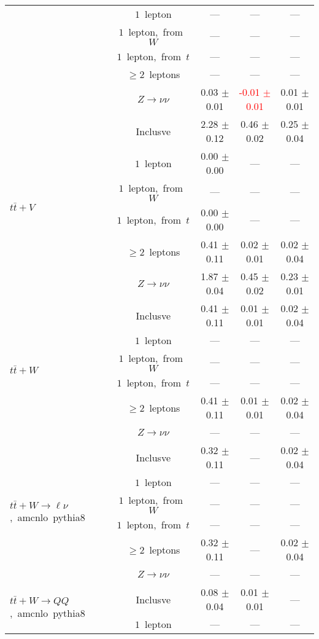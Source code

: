 \documentclass{article}
\begin{document}
\begin{longtable}{|l|c|c|c|c|}
 & $1$~lepton  & ---  & ---  & --- \\* 
 & $1$~lepton,~from~$W$  & ---  & ---  & --- \\* 
 & $1$~lepton,~from~$t$  & ---  & ---  & --- \\* 
 & $\ge2$~leptons  & ---  & ---  & --- \\* 
 & $Z\rightarrow\nu\nu$  & 0.03 $\pm$ 0.01  & \textcolor{red}{ -0.01 $\pm$ 0.01 }  & 0.01 $\pm$ 0.01 \\* 
\hline 
\multirow{6}{*}{$t\bar{t}+V$} & Inclusve  & 2.28 $\pm$ 0.12  & 0.46 $\pm$ 0.02  & 0.25 $\pm$ 0.04 \\* 
 & $1$~lepton  & 0.00 $\pm$ 0.00  & ---  & --- \\* 
 & $1$~lepton,~from~$W$  & ---  & ---  & --- \\* 
 & $1$~lepton,~from~$t$  & 0.00 $\pm$ 0.00  & ---  & --- \\* 
 & $\ge2$~leptons  & 0.41 $\pm$ 0.11  & 0.02 $\pm$ 0.01  & 0.02 $\pm$ 0.04 \\* 
 & $Z\rightarrow\nu\nu$  & 1.87 $\pm$ 0.04  & 0.45 $\pm$ 0.02  & 0.23 $\pm$ 0.01 \\* 
\hline 
\multirow{6}{*}{$t\bar{t}+W$} & Inclusve  & 0.41 $\pm$ 0.11  & 0.01 $\pm$ 0.01  & 0.02 $\pm$ 0.04 \\* 
 & $1$~lepton  & ---  & ---  & --- \\* 
 & $1$~lepton,~from~$W$  & ---  & ---  & --- \\* 
 & $1$~lepton,~from~$t$  & ---  & ---  & --- \\* 
 & $\ge2$~leptons  & 0.41 $\pm$ 0.11  & 0.01 $\pm$ 0.01  & 0.02 $\pm$ 0.04 \\* 
 & $Z\rightarrow\nu\nu$  & ---  & ---  & --- \\* 
\hline 
\multirow{6}{*}{$t\bar{t}+W{\rightarrow}{\ell}{\nu}$,~amcnlo~pythia8} & Inclusve  & 0.32 $\pm$ 0.11  & ---  & 0.02 $\pm$ 0.04 \\* 
 & $1$~lepton  & ---  & ---  & --- \\* 
 & $1$~lepton,~from~$W$  & ---  & ---  & --- \\* 
 & $1$~lepton,~from~$t$  & ---  & ---  & --- \\* 
 & $\ge2$~leptons  & 0.32 $\pm$ 0.11  & ---  & 0.02 $\pm$ 0.04 \\* 
 & $Z\rightarrow\nu\nu$  & ---  & ---  & --- \\* 
\hline 
\multirow{6}{*}{$t\bar{t}+W{\rightarrow}QQ$,~amcnlo~pythia8} & Inclusve  & 0.08 $\pm$ 0.04  & 0.01 $\pm$ 0.01  & --- \\* 
 & $1$~lepton  & ---  & ---  & --- \\* 

\end{longtable}
\end{document}

